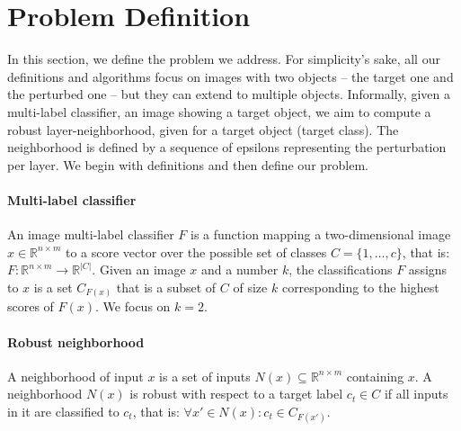 
\section{Problem Definition}
In this section, we define the problem we address.
For simplicity's sake, all our definitions and algorithms focus on images with two objects -- the target one and the perturbed one -- but they can extend to multiple objects.
Informally, given a multi-label classifier, an image showing a target object, we aim to compute a robust layer-neighborhood, given for a target object (target class).
The neighborhood is defined by a sequence of epsilons representing the perturbation per layer.
We begin with definitions and then define our problem.
\sloppy
\paragraph{Multi-label classifier}
An image multi-label classifier $F$ is a function mapping a two-dimensional image $x\in \mathbb{R}^{n \times m}$ to a score vector over the possible set of classes $C=\{1,\ldots,c\}$, that is:
$F: \mathbb{R}^{n \times m} \rightarrow {\mathbb{R}}^{|C|}$.
Given an image $x$ and a number $k$, the classifications $F$ assigns to $x$ is a set $C_{F(x)}$ that is a subset of $C$ of size $k$ corresponding to the highest scores of $F(x)$. We focus on $k=2$. %

\paragraph{Robust neighborhood}
A neighborhood of input $x$ is a set of inputs $N(x) \subseteq \mathbb{R}^{n \times m}$ containing $x$.
A neighborhood $N(x)$ is robust with respect to a target label $c_t \in C$ if all inputs in it are classified to $c_t$, that is: $\forall x' \in N(x): c_t \in C_{F(x')}$. %

